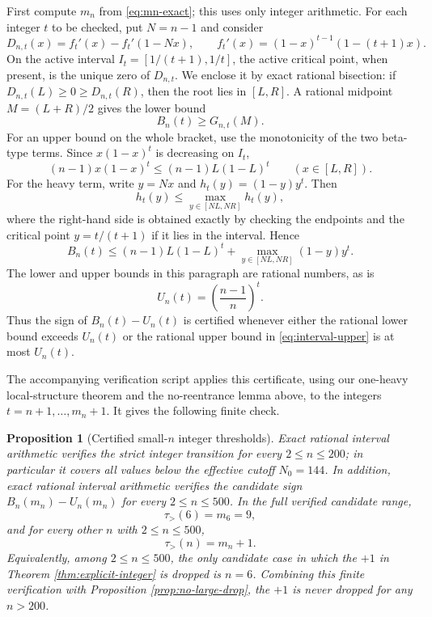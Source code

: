 \documentclass[11pt]{article}
\newtheorem{proposition}[theorem]{Proposition}
\theoremstyle{definition}
\begin{document}
First compute $m_n$ from \eqref{eq:mn-exact}; this uses only integer arithmetic.  For each integer $t$ to be checked, put $N=n-1$ and consider
\[
  D_{n,t}(x)=f_t'(x)-f_t'(1-Nx),
  \qquad f_t'(x)=(1-x)^{t-1}(1-(t+1)x).
\]
On the active interval $I_t=[1/(t+1),1/t]$, the active critical point, when present, is the unique zero of $D_{n,t}$.  We enclose it by exact rational bisection: if $D_{n,t}(L)\ge0\ge D_{n,t}(R)$, then the root lies in $[L,R]$.  A rational midpoint $M=(L+R)/2$ gives the lower bound
\[
  B_n(t)\ge G_{n,t}(M).
\]
For an upper bound on the whole bracket, use the monotonicity of the two beta-type terms.  Since $x(1-x)^t$ is decreasing on $I_t$,
\[
  (n-1)x(1-x)^t\le (n-1)L(1-L)^t\qquad (x\in[L,R]).
\]
For the heavy term, write $y=Nx$ and $h_t(y)=(1-y)y^t$.  Then
\[
  h_t(y)\le \max_{y\in[NL,NR]}h_t(y),
\]
where the right-hand side is obtained exactly by checking the endpoints and the critical point $y=t/(t+1)$ if it lies in the interval.  Hence
\begin{equation}\label{eq:interval-upper}
  B_n(t)
  \le (n-1)L(1-L)^t+
  \max_{y\in[NL,NR]}(1-y)y^t.
\end{equation}
The lower and upper bounds in this paragraph are rational numbers, as is
\[
  U_n(t)=\left(\frac{n-1}{n}\right)^t.
\]
Thus the sign of $B_n(t)-U_n(t)$ is certified whenever either the rational lower bound exceeds $U_n(t)$ or the rational upper bound in \eqref{eq:interval-upper} is at most $U_n(t)$.

The accompanying verification script applies this certificate, using our one-heavy local-structure theorem and the no-reentrance lemma above, to the integers $t=n+1,\ldots,m_n+1$.  It gives the following finite check.

\begin{proposition}[Certified small-$n$ integer thresholds]\label{prop:small-n-verified}
Exact rational interval arithmetic verifies the strict integer transition for every $2\le n\le 200$; in particular it covers all values below the effective cutoff $N_0=144$.  In addition, exact rational interval arithmetic verifies the candidate sign $B_n(m_n)-U_n(m_n)$ for every $2\le n\le500$.  In the full verified candidate range,
\[
  \tau_>(6)=m_6=9,
\]
and for every other $n$ with $2\le n\le 500$,
\[
  \tau_>(n)=m_n+1.
\]
Equivalently, among $2\le n\le 500$, the only candidate case in which the $+1$ in Theorem \ref{thm:explicit-integer} is dropped is $n=6$.  Combining this finite verification with Proposition \ref{prop:no-large-drop}, the $+1$ is never dropped for any $n>200$.
\end{proposition}
\end{document}
